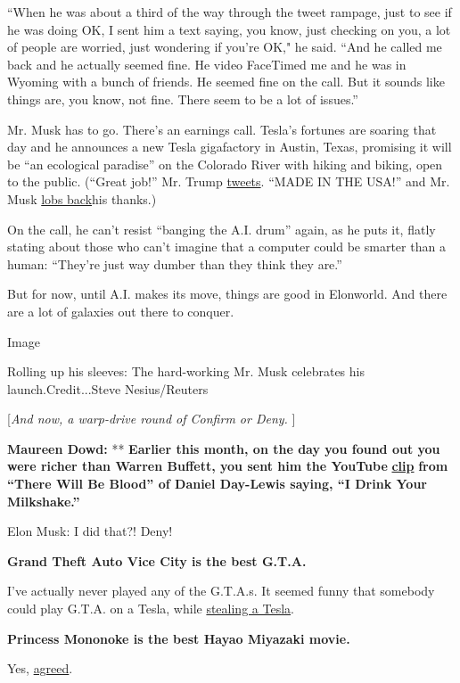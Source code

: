 ``When he was about a third of the way through the tweet rampage, just
to see if he was doing OK, I sent him a text saying, you know, just
checking on you, a lot of people are worried, just wondering if you're
OK," he said. ``And he called me back and he actually seemed fine. He
video FaceTimed me and he was in Wyoming with a bunch of friends. He
seemed fine on the call. But it sounds like things are, you know, not
fine. There seem to be a lot of issues.''

Mr. Musk has to go. There's an earnings call. Tesla's fortunes are
soaring that day and he announces a new Tesla gigafactory in Austin,
Texas, promising it will be ``an ecological paradise'' on the Colorado
River with hiking and biking, open to the public. (``Great job!'' Mr.
Trump
\href{https://twitter.com/realdonaldtrump/status/1286662316717744128?s=11}{tweets}.
``MADE IN THE USA!'' and Mr. Musk
\href{https://twitter.com/elonmusk/status/1286665488957878273}{lobs
back}his thanks.)

On the call, he can't resist ``banging the A.I. drum'' again, as he puts
it, flatly stating about those who can't imagine that a computer could
be smarter than a human: ``They're just way dumber than they think they
are.''

But for now, until A.I. makes its move, things are good in Elonworld.
And there are a lot of galaxies out there to conquer.

Image

Rolling up his sleeves: The hard-working Mr. Musk celebrates his
launch.Credit...Steve Nesius/Reuters

{[}\emph{And now, a warp-drive round of Confirm or Deny.} {]}

\textbf{Maureen Dowd:} ** \textbf{Earlier this month, on the day you
found out you were richer than Warren Buffett, you sent him the YouTube}
\textbf{\href{https://www.youtube.com/watch?v=s_hFTR6qyEo}{clip}}
\textbf{from ``There Will Be Blood'' of Daniel Day-Lewis saying, ``I
Drink Your Milkshake.''}

Elon Musk: I did that?! Deny!

\textbf{Grand Theft Auto Vice City is the best G.T.A.}

I've actually never played any of the G.T.A.s. It seemed funny that
somebody could play G.T.A. on a Tesla, while
\href{https://www.youtube.com/watch?v=8xYcOHNH8-Y}{stealing a Tesla}.

\textbf{Princess Mononoke is the best Hayao Miyazaki movie.}

Yes,
\href{https://www.nytimes3xbfgragh.onion/1999/09/27/movies/film-review-waging-a-mythic-battle-to-preserve-a-pristine-forest.html}{agreed}.

